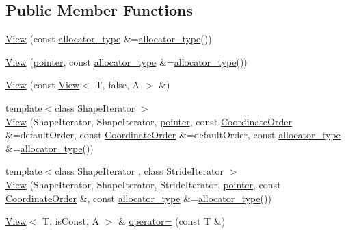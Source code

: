 \subsection*{Public Member Functions}
\begin{DoxyCompactItemize}
\item 
\hyperlink{classandres_1_1View_a4368fd5dbfc08a75115341bfa7123a87}{View} (const \hyperlink{classandres_1_1View_a175e5862a7133a937e7901e5894c2e10}{allocator\+\_\+type} \&=\hyperlink{classandres_1_1View_a175e5862a7133a937e7901e5894c2e10}{allocator\+\_\+type}())
\item 
\hyperlink{classandres_1_1View_af4519c20472df4ed36905b3b6574cc46}{View} (\hyperlink{classandres_1_1View_a9a201594c82be89fccd0fe644ea2f09c}{pointer}, const \hyperlink{classandres_1_1View_a175e5862a7133a937e7901e5894c2e10}{allocator\+\_\+type} \&=\hyperlink{classandres_1_1View_a175e5862a7133a937e7901e5894c2e10}{allocator\+\_\+type}())
\item 
\hyperlink{classandres_1_1View_ae2969a649e8ced36cb05e79985f4656f}{View} (const \hyperlink{classandres_1_1View}{View}$<$ T, false, A $>$ \&)
\item 
{\footnotesize template$<$class Shape\+Iterator $>$ }\\\hyperlink{classandres_1_1View_ad7ee18ef33ab6e92138ba0ded346086d}{View} (Shape\+Iterator, Shape\+Iterator, \hyperlink{classandres_1_1View_a9a201594c82be89fccd0fe644ea2f09c}{pointer}, const \hyperlink{namespaceandres_a2ac8b7aa89d44e8188a7c0ba50f4306b}{Coordinate\+Order} \&=default\+Order, const \hyperlink{namespaceandres_a2ac8b7aa89d44e8188a7c0ba50f4306b}{Coordinate\+Order} \&=default\+Order, const \hyperlink{classandres_1_1View_a175e5862a7133a937e7901e5894c2e10}{allocator\+\_\+type} \&=\hyperlink{classandres_1_1View_a175e5862a7133a937e7901e5894c2e10}{allocator\+\_\+type}())
\item 
{\footnotesize template$<$class Shape\+Iterator , class Stride\+Iterator $>$ }\\\hyperlink{classandres_1_1View_a3abf83b3422d78b41560e6f87ecb542e}{View} (Shape\+Iterator, Shape\+Iterator, Stride\+Iterator, \hyperlink{classandres_1_1View_a9a201594c82be89fccd0fe644ea2f09c}{pointer}, const \hyperlink{namespaceandres_a2ac8b7aa89d44e8188a7c0ba50f4306b}{Coordinate\+Order} \&, const \hyperlink{classandres_1_1View_a175e5862a7133a937e7901e5894c2e10}{allocator\+\_\+type} \&=\hyperlink{classandres_1_1View_a175e5862a7133a937e7901e5894c2e10}{allocator\+\_\+type}())
\item 
\hyperlink{classandres_1_1View}{View}$<$ T, is\+Const, A $>$ \& \hyperlink{classandres_1_1View_a398b0af0619bbfca644c0a2a53b598e9}{operator=} (const T \&)

\end{DoxyCompactItemize}
